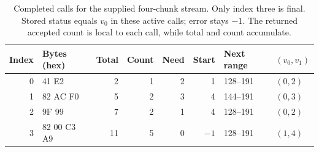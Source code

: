 \begin{table}[htbp]
  \centering
  \small
  \setlength{\tabcolsep}{5pt}
  \begin{tabular}{rlrrrrll}
    \toprule
    Index & Bytes (hex) & Total & Count & Need & Start & Next range & $(v_0,v_1)$ \\
    \midrule
    0     & 41 E2       & 2     & 1     & 2    & 1     & 128--191   & $(0,2)$     \\
    1     & 82 AC F0    & 5     & 2     & 3    & 4     & 144--191   & $(0,3)$     \\
    2     & 9F 99       & 7     & 2     & 1    & 4     & 128--191   & $(0,2)$     \\
    3     & 82 00 C3 A9 & 11    & 5     & 0    & $-1$  & 128--191   & $(1,4)$     \\
    \bottomrule
  \end{tabular}
  \caption{Completed calls for the supplied four-chunk stream. Only index three is final. Stored status equals $v_0$ in these active calls; error stays $-1$. The returned accepted count is local to each call, while total and count accumulate.}
  \label{tab:revision-utf8-chunks}
\end{table}
